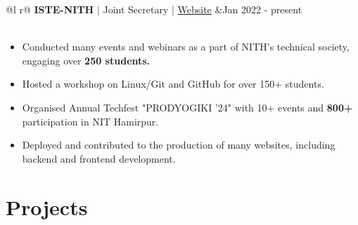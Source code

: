 \documentclass[legalpaper,11pt]{article}
\begin{document}

\begin{tabularx}{\linewidth}{ @{}l r@{} }
\textbf{ISTE-NITH} $|$ Joint Secretary $|$ \href{https://www.istenith.com/}{Website} &\hfill Jan 2022 - present \\[3.75pt]
 \\
\end{tabularx}

\begin{itemize}[leftmargin=*,noitemsep,topsep=0pt]
    \item Conducted many events and webinars as a part of NITH's technical society, engaging over \textbf{250 students.}
    \item Hosted a workshop on Linux/Git and GitHub for over 150+ students.
    \item Organised Annual Techfest "PRODYOGIKI '24" with 10+ events and \textbf{800+} participation in NIT Hamirpur.
    \item Deployed and contributed to the production of many websites, including backend and frontend development.
\end{itemize}


\section{Projects}
\end{document}
